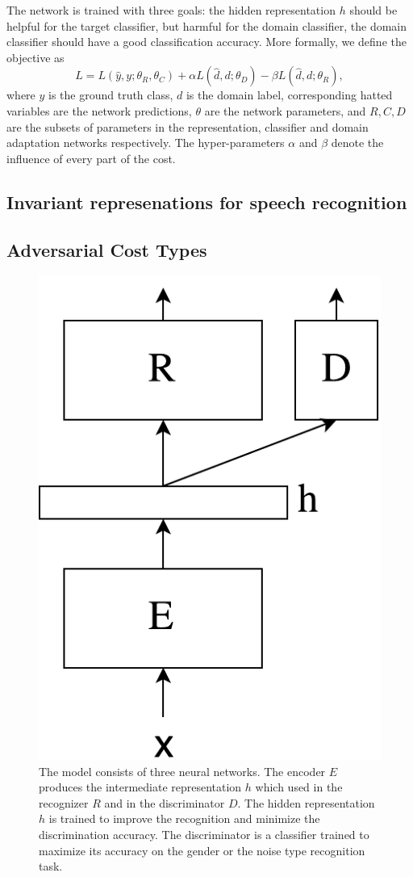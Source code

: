 \documentclass{article}
\begin{document}
    The network is trained with three goals: the hidden representation $h$ should
    be helpful for the target classifier, but harmful for the domain classifier,
    the domain classifier should have a good classification accuracy. More 
    formally, we define the objective as
    \begin{equation}
        L = L(\hat{y}, y; \theta_R, \theta_C) + 
        \alpha L(\hat{d}, d; \theta_D) -
        \beta L(\hat{d}, d; \theta_R),
    \end{equation}
    where $y$ is the ground truth class, $d$ is the domain label, corresponding
    hatted variables are the network predictions, $\theta$ are the network 
    parameters, and $R, C, D$ are the subsets of parameters in the representation,
    classifier and domain adaptation networks respectively. The hyper-parameters
    $\alpha$ and $\beta$ denote the influence of every part of the cost.

\subsection{Invariant represenations for speech recognition}
\label{sec:invariant-speech}

\subsection{Adversarial Cost Types}


\begin{figure}
    \centering
    \includegraphics[width=0.3\linewidth]{model.pdf}
    \caption{The model consists of three neural networks. The encoder $E$ produces
    the intermediate representation $h$ which used in the recognizer $R$ and 
    in the discriminator $D$. The hidden representation $h$ is trained to improve
    the recognition and minimize the discrimination accuracy. The discriminator
    is a classifier trained to maximize its accuracy on the gender or the noise type
    recognition task.}
    \label{fig:model}
\end{figure}
\end{document}
